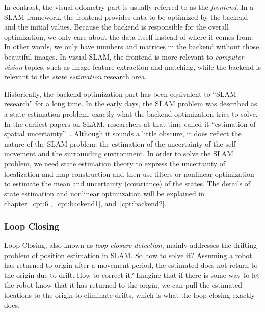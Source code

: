 In contrast, the visual odometry part is usually referred to as the \textit{frontend}. In a SLAM framework, the frontend provides data to be optimized by the backend and the initial values. Because the backend is responsible for the overall optimization, we only care about the data itself instead of where it comes from. In other words, we only have numbers and matrices in the backend without those beautiful images. In visual SLAM, the frontend is more relevant to \textit{computer vision} topics, such as image feature extraction and matching, while the backend is relevant to the \textit{state estimation} research area.

Historically, the backend optimization part has been equivalent to ``SLAM research'' for a long time. In the early days, the SLAM problem was described as a state estimation problem, exactly what the backend optimization tries to solve. In the earliest papers on SLAM, researchers at that time called it ``estimation of spatial uncertainty''~\cite{Smith1986, Smith1990}. Although it sounds a little obscure, it does reflect the nature of the SLAM problem: the estimation of the uncertainty of the self-movement and the surrounding environment. In order to solve the SLAM problem, we need state estimation theory to express the uncertainty of localization and map construction and then use filters or nonlinear optimization to estimate the mean and uncertainty (covariance) of the states. The details of state estimation and nonlinear optimization will be explained in chapter~\ref{cpt:6},~\ref{cpt:backend1}, and~\ref{cpt:backend2}.

\subsubsection{Loop Closing}
Loop Closing, also known as \textit{loop closure detection}, mainly addresses the drifting problem of position estimation in SLAM. So how to solve it? Assuming a robot has returned to origin after a movement period, the estimated does not return to the origin due to drift. How to correct it? Imagine that if there is some way to let the robot know that it has returned to the origin, we can pull the estimated locations to the origin to eliminate drifts, which is what the loop closing exactly does.


